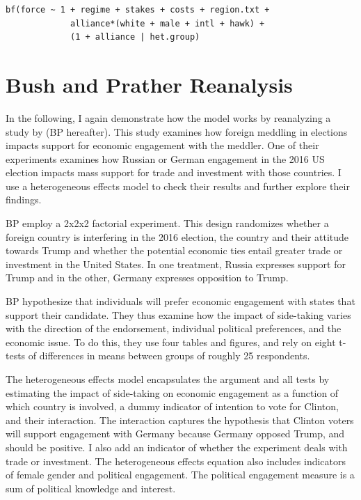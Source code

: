 \documentclass[12pt]{article}
\begin{document}
\begin{verbatim}
bf(force ~ 1 + regime + stakes + costs + region.txt +
             alliance*(white + male + intl + hawk) +
             (1 + alliance | het.group) 
\end{verbatim}



\section{Bush and Prather Reanalysis}


In the following, I again demonstrate how the model works by reanalyzing a study by \citet{BushPrather2020} (BP hereafter). 
This study examines how foreign meddling in elections impacts support for economic engagement with the meddler. 
One of their experiments examines how Russian or German engagement in the 2016 US election impacts mass support for trade and investment with those countries.
I use a heterogeneous effects model to check their results and further explore their findings. 


BP employ a 2x2x2 factorial experiment.
This design randomizes whether a foreign country is interfering in the 2016 election, the country and their attitude towards Trump and whether the potential economic ties entail greater trade or investment in the United States.
In one treatment, Russia expresses support for Trump and in the other, Germany expresses opposition to Trump. 


BP hypothesize that individuals will prefer economic engagement with states that support their candidate. 
They thus examine how the impact of side-taking varies with the direction of the endorsement, individual political preferences, and the economic issue. 
To do this, they use four tables and figures, and rely on eight t-tests of differences in means between groups of roughly 25 respondents. 


The heterogeneous effects model encapsulates the argument and all tests by estimating the impact of side-taking on economic engagement as a function of which country is involved, a dummy indicator of intention to vote for Clinton, and their interaction. 
The interaction captures the hypothesis that Clinton voters will support engagement with Germany because Germany opposed Trump, and should be positive. 
I also add an indicator of whether the experiment deals with trade or investment. 
The heterogeneous effects equation also includes indicators of female gender and political engagement. 
The political engagement measure is a sum of political knowledge and interest. 
\end{document}
